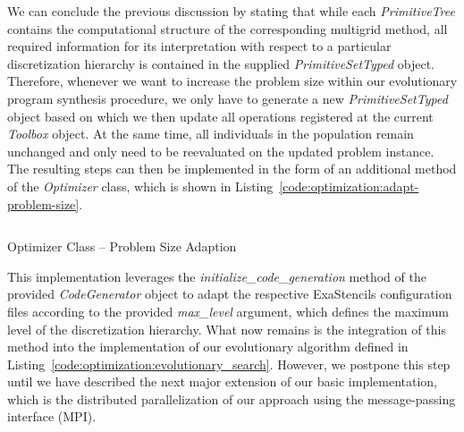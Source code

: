 We can conclude the previous discussion by stating that while each \emph{PrimitiveTree} contains the computational structure of the corresponding multigrid method, all required information for its interpretation with respect to a particular discretization hierarchy is contained in the supplied \emph{PrimitiveSetTyped} object.
Therefore, whenever we want to increase the problem size within our evolutionary program synthesis procedure, we only have to generate a new \emph{PrimitiveSetTyped} object based on which we then update all operations registered at the current \emph{Toolbox} object.
At the same time, all individuals in the population remain unchanged and only need to be reevaluated on the updated problem instance.
The resulting steps can then be implemented in the form of an additional method of the \emph{Optimizer} class, which is shown in Listing~\ref{code:optimization:adapt-problem-size}.
\begin{listing}
	\inputminted{python}{evostencils/optimization/adapt_problem_size.py}
	\caption{Optimizer Class -- Problem Size Adaption}
	\label{code:optimization:adapt-problem-size}
\end{listing}
This implementation leverages the \emph{initialize\_code\_generation} method of the provided \emph{CodeGenerator} object to adapt the respective ExaStencils configuration files according to the provided \emph{max\_level} argument, which defines the maximum level of the discretization hierarchy.
What now remains is the integration of this method into the implementation of our evolutionary algorithm defined in Listing~\ref{code:optimization:evolutionary_search}.
However, we postpone this step until we have described the next major extension of our basic implementation, which is the distributed parallelization of our approach using the message-passing interface (MPI).

